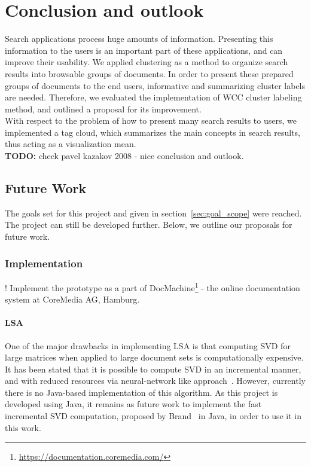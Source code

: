 \chapter{Conclusion and outlook}
\label{sec:conclusion}

Search applications process huge amounts of information. Presenting this information to the users is an important part of these applications, and can improve their usability. We applied clustering as a method to organize search results into browsable groups of documents. In order to present these prepared groups of documents to the end users, informative and summarizing cluster labels are needed. Therefore, we evaluated the implementation of \gls{WCC} cluster labeling method, and outlined a proposal for its improvement. \\

With respect to the problem of how to present many search results to users, we implemented a tag cloud, which summarizes the main concepts in search results, thus acting as a visualization mean. \\

\textbf{TODO:} check pavel kazakov 2008 - nice conclusion and outlook. \\

\section{Future Work}
The goals set for this project and given in section~\ref{sec:goal_scope} were reached. The project can still be developed further. Below, we outline our proposals for future work. \\

\subsection{Implementation}

! Implement the prototype as a part of DocMachine\footnote{\url{https://documentation.coremedia.com/}} - the online documentation system at CoreMedia AG, Hamburg.

\subsubsection{LSA}
One of the major drawbacks in implementing \gls{LSA} is that computing \gls{SVD} for large matrices when applied to large document sets is computationally expensive. It has been stated that it is possible to compute \gls{SVD} in an incremental manner, and with reduced resources via neural-network like approach~\cite{brand06}. However, currently there is no Java-based implementation of this algorithm. As this project is developed using Java, it remains as future work to implement the fast incremental \gls{SVD} computation, proposed by Brand~\cite{brand06} in Java, in order to use it in this work. \\

